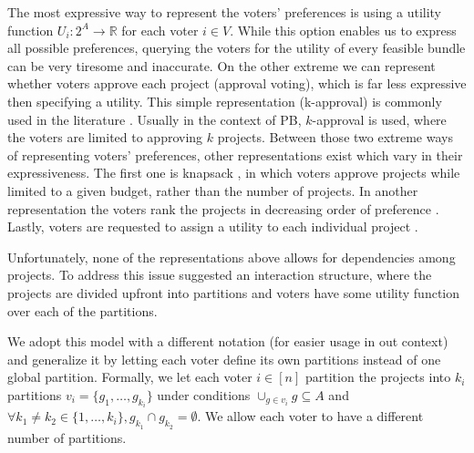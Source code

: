\documentclass[runningheads]{llncs}
\begin{document}
The most expressive way to represent the voters' preferences is using a utility function $U_i:2^A\rightarrow \mathbb R$  for each voter $i\in V$. While this option enables us to express all possible preferences, querying the voters for the utility of every feasible bundle can be very tiresome and inaccurate.
On the other extreme we can represent whether voters approve each project (approval voting),  
which is far less expressive then specifying a utility. This simple representation (k-approval) is commonly  used in the literature \cite{aziz2021participatory, aziz2017proportionally}.
Usually in the context of PB, $k$-approval is used, where the voters are limited to approving $k$ projects.
Between those two extreme ways of representing  voters' preferences,   other 
representations exist which vary in their expressiveness. The first one is knapsack \cite{goel2019knapsack}, 
in which voters approve projects while  limited to a given budget, rather than the number of projects. In another representation the voters  rank   the projects  in decreasing order of preference  \cite{benade2020preference}.
Lastly, voters are requested to assign a utility to each individual project \cite{peters2020proportional}.


Unfortunately, none of the representations above allows for dependencies among projects. To address this issue \citet{jain2020participatory} suggested an interaction structure, where the projects are divided upfront into partitions and voters have some utility function over each of the partitions.

We adopt this model with a different notation (for easier usage in out context) and generalize it by letting each voter define its own partitions instead of one global partition.
Formally, we let  each voter $i\in [n]$ partition the projects into $k_i$ partitions $v_i=\{g_1,\ldots,g_{k_i}\}$ under conditions  $\cup_{g\in v_i}g\subseteq A$ and $\forall k_1\neq k_2 \in \{1,\ldots,k_i\}, g_{k_1}\cap g_{k_2}=\emptyset$. We allow each voter to have a different number of  partitions. 
\end{document}
